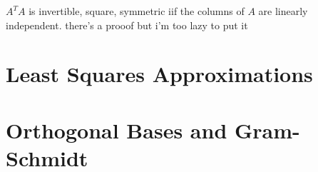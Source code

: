 \documentclass{article}
\begin{document}
$A^T A$ is invertible, square, symmetric iif the columns of $A$ are linearly independent. there's a prooof but i'm too lazy to put it

\section{Least Squares Approximations}


\section{Orthogonal Bases and Gram-Schmidt}
\cite{ctan}

\newpage

\nocite{*}


\end{document}
